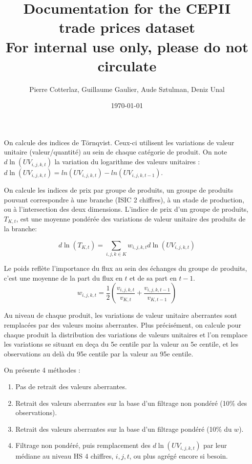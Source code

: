 \documentclass[12pt]{article}
\title{Documentation for the CEPII trade prices dataset \\
\small{For internal use only, please do not circulate}}
\author{Pierre Cotterlaz, Guillaume Gaulier, Aude Sztulman, Deniz Unal}
\date{\today}
\begin{document}
\maketitle

On calcule des indices de Törnqvist. Ceux-ci utilisent les variations de valeur unitaire (valeur/quantité) au sein de chaque catégorie de produit. On note $d\ln(UV_{i,j,k,t})$ la variation du logarithme des valeurs unitaires : $d\ln(UV_{i,j,k,t}) = ln(UV_{i,j,k,t}) - ln(UV_{i,j,k,t-1})$. 

On calcule les indices de prix par groupe de produits, un groupe de produits pouvant correspondre à une branche (ISIC 2 chiffres), à un stade de production, ou à l'intersection des deux dimensions. L'indice de prix d'un groupe de produits, $T_{K,t}$, est une moyenne pondérée des variations de valeur unitaire des produits de la branche: 

\begin{equation*}
    d\ln(T_{K,t}) = \sum_{i,j,k \in K} w_{i,j,k,t} d\ln(UV_{i,j,k,t})
\end{equation*}

Le poids reflète l'importance du flux au sein des échanges du groupe de produits, c'est une moyenne de la part du flux en $t$ et de sa part en $t-1$. 
$$w_{i,j,k,t} = \frac{1}{2} \left( \frac{v_{i,j,k,t}}{v_{K,t}} + \frac{v_{i,j,k,t-1}}{v_{K,t-1}}  \right)$$

Au niveau de chaque produit, les variations de valeur unitaire aberrantes sont remplacées par des valeurs moins aberrantes. Plus précisément, on calcule pour chaque produit la distribution des variations de valeurs unitaires et l'on remplace les variations se situant en deça du 5e centile par la valeur au 5e centile, et les observations au delà du 95e centile par la valeur au 95e centile.

On présente 4 méthodes : 

\begin{enumerate}
\item Pas de retrait des valeurs aberrantes.
\item Retrait des valeurs aberrantes sur la base d'un filtrage non pondéré (10\% des observations).
\item Retrait des valeurs aberrantes sur la base d'un filtrage pondéré (10\% du $w$).
\item Filtrage non pondéré, puis remplacement des $d\ln(UV_{i,j,k,t})$ par leur médiane au niveau HS 4 chiffres, $i,j,t$, ou plus agrégé encore si besoin.  
\end{enumerate}
\end{document}
